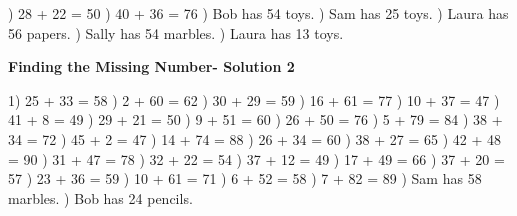\documentclass{article}%
\begin{document}
) 28 + 22 = 50%
) 40 + 36 = 76%
) Bob has 54 toys.%
) Sam has 25 toys.%
) Laura has 56 papers.%
) Sally has 54 marbles.%
) Laura has 13 toys.%
\newline%
\newpage%
\large%
\begin{center}%
\textbf{Finding the Missing Number- Solution 2}%
\newline%
\end{center} \normalsize%
1) 25 + 33 = 58%
) 2 + 60 = 62%
) 30 + 29 = 59%
) 16 + 61 = 77%
) 10 + 37 = 47%
) 41 + 8 = 49%
) 29 + 21 = 50%
) 9 + 51 = 60%
) 26 + 50 = 76%
) 5 + 79 = 84%
) 38 + 34 = 72%
) 45 + 2 = 47%
) 14 + 74 = 88%
) 26 + 34 = 60%
) 38 + 27 = 65%
) 42 + 48 = 90%
) 31 + 47 = 78%
) 32 + 22 = 54%
) 37 + 12 = 49%
) 17 + 49 = 66%
) 37 + 20 = 57%
) 23 + 36 = 59%
) 10 + 61 = 71%
) 6 + 52 = 58%
) 7 + 82 = 89%
) Sam has 58 marbles.%
) Bob has 24 pencils.%
\newline%
\end{document}
